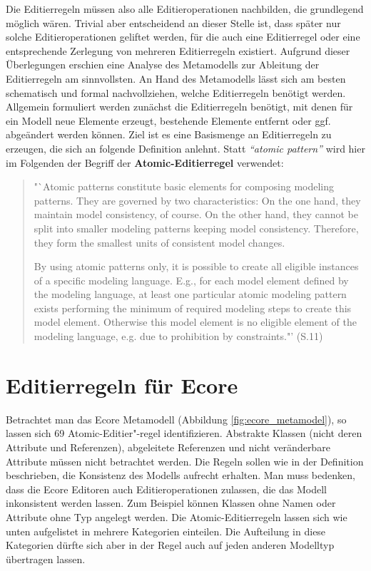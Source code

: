 Die Editierregeln müssen also alle Editieroperationen nachbilden, die grundlegend möglich wären.
Trivial aber entscheidend an dieser Stelle ist, dass später nur solche Editieroperationen geliftet
werden, für die auch eine Editierregel oder eine entsprechende Zerlegung von mehreren Editierregeln
existiert. Aufgrund dieser Überlegungen erschien eine Analyse des Metamodells zur Ableitung der
Editierregeln am sinnvollsten. An Hand des Metamodells lässt sich am besten schematisch und formal
nachvollziehen, welche Editierregeln benötigt werden. Allgemein formuliert werden zunächst die
Editierregeln benötigt, mit denen für ein Modell neue Elemente erzeugt, bestehende Elemente entfernt
oder ggf. abgeändert werden können. Ziel ist es eine Basismenge an Editierregeln zu erzeugen, die
sich an folgende Definition anlehnt. Statt \textit{"`atomic pattern"'} wird hier im Folgenden der
Begriff der \textbf{Atomic-Editierregel} verwendet:

\begin{quote}
"`Atomic patterns constitute basic elements for composing modeling patterns. They are governed by
two characteristics: On the one hand, they maintain model consistency, of course. On the other hand,
they cannot be split into smaller modeling patterns keeping model consistency. Therefore, they form
the smallest units of consistent model changes.

By using atomic patterns only, it is possible to create all eligible instances of a specific
modeling language. E.g., for each model element defined by the modeling language, at least one
particular atomic modeling pattern exists performing the minimum of required modeling steps to
create this model element. Otherwise this model element is no eligible element of the modeling
language, e.g. due to prohibition by constraints."' \cite{W2010} (S.11)
\end{quote}

\section{Editierregeln für Ecore}

Betrachtet man das Ecore Metamodell (Abbildung \ref{fig:ecore_metamodel}), so lassen sich 69
Atomic-Editier"-regel identifizieren. Abstrakte Klassen (nicht deren Attribute und Referenzen),
abgeleitete Referenzen und nicht veränderbare Attribute müssen nicht betrachtet werden. Die Regeln
sollen wie in der Definition beschrieben, die Konsistenz des Modells aufrecht erhalten. Man muss
bedenken, dass die Ecore Editoren auch Editieroperationen zulassen, die das Modell inkonsistent
werden lassen. Zum Beispiel können Klassen ohne Namen oder Attribute ohne Typ angelegt werden. Die
Atomic-Editierregeln lassen sich wie unten aufgelistet in mehrere Kategorien einteilen. Die
Aufteilung in diese Kategorien dürfte sich aber in der Regel auch auf jeden anderen Modelltyp
übertragen lassen.

